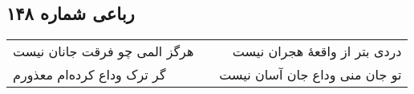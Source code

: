 \begin{center}
\section*{رباعی شماره ۱۴۸}
\label{sec:sh148}
\begin{longtable}{l p{0.5cm} r}
هرگز المی چو فرقت جانان نیست
&&
دردی بتر از واقعهٔ هجران نیست
\\
گر ترک وداع کرده‌ام معذورم
&&
تو جان منی وداع جان آسان نیست
\\
\end{longtable}
\end{center}
